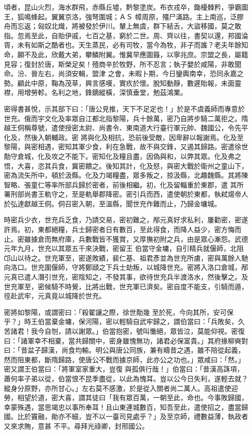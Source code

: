 \begin{pinyinscope}
 頃者，昆山火烈，海水群飛，赤縣丘墟，黔黎塗炭。布衣戎卒，鋤櫌棘矜，爭霸圖王，狐鳴蜂起。翼翼京洛，強弩圍城；ＡＳ
 幛周原，殭尸滿路。主上南巡，泛膠舟而忘返；匈奴北熾，將被發於伊川。輦上無虞，群下結舌，大盜移國，莫之敢指。忽焉至此，自貽伊戚，七百之基，窮於二世。周、齊以往，書契以還，邦國淪胥，未有如斯之酷者也。天生蒸民，必有司牧，當今為牧，非子而誰？老夫年餘知命，願不及此，欣戴大弟，攀鱗附翼。惟冀早應圖籙，以寧兆庶。宗盟之長，屬籍見容；復封於唐，斯榮足矣！殪商辛於牧野，所不忍言；執子嬰於咸陽，非敢聞命。汾、晉左右，尚須安輯，盟津
 之會，未暇卜期，今日鑾輿南幸，恐同永嘉之勢。顧此中原，鞠為茂草，興言感嘆，實疚於懷。脫知動靜，數遲貽報，未面靈襟，用增勞軫。名利之地，鋒鏑縱橫，深慎垂堂，勉茲鴻業。



 密得書甚悅，示其部下曰：「唐公見推，天下不足定也！」於是不虞義師而專意於世充。俄而宇文化及率眾自江都北指黎陽，兵十餘萬，密乃自將步騎二萬拒之。隋越王侗稱尊號，遣使授密太尉、尚書令、東南道大行臺行軍元帥、魏國公，令先平化及，然後入朝輔政。密
 將與化及相抗，恐前後受敵，因卑辭以報謝焉。化及至黎陽，與密相遇，密知其軍少食，利在急戰，故不與交鋒，又遏其歸路。密遣徐世勣守倉城，化及攻之不能下。密知化及糧且盡，因偽與和，以弊其眾。化及弗之悟，大喜，恣其兵食，冀密饋之。後知其計，化及怒，與密大戰於衛州之童山下，密為流矢所中，頓於汲縣。化及力竭糧盡，眾多叛之，掠汲縣，北趣魏縣。其將陳智略、張童仁等率所部兵歸於密者，前後相繼。初，化及留輜重於東郡，遣
 其所署刑部尚書王軌守之，至是軌舉郡降密。密引兵而西，遣使朝於東都，執弒煬帝人於弘達獻越王侗。侗召密入朝，至溫縣，聞世充作難而止，乃歸金墉城。



 時密兵少衣，世充兵乏食，乃請交易，密初難之，邴元真好求私利，屢勸密，密遂許焉。初，東都絕糧，兵士歸密者日有數百，至此得食，而降人益少，密方悔而止。密雖據倉而無府庫，兵數戰皆不獲賞，又厚撫初附之兵，由是眾心漸怨。武德元年九月，世充以其眾五千來決戰，密留王
 伯當守金墉，自引精兵就偃師，北阻邙山以待之。世充軍至，密遂敗績，裴仁基、祖君彥並為世充所虜，密與萬餘人馳向洛口。世充圍偃師，守將鄭頲之下兵士劫叛，以城降世充。密將入洛口倉城，邴元真已遣人潛引世充，密陰知之，不發其事，欲待世充兵半渡洛水，然後擊之。及世充軍至，密候騎不時覺，比將出戰，世充軍已濟矣。密自度不能支，引騎而遁，徑赴武牢，元真竟以城降於世充。



 密將如黎陽，或謂密曰：「殺翟讓之際，徐世勣幾
 至於死，今向其所，安可保乎？」時王伯當棄金墉，保河陽，密以輕騎自武牢歸之，謂伯當曰：「兵敗矣，久苦諸君！我今自刎，請以謝眾。」伯當抱密，號叫慟絕，眾皆泣，莫能仰視。密復曰：「諸軍幸不相棄，當共歸關中，密身雖愧無功，諸君必保富貴。」其府掾柳奭對曰：「昔盆子歸漢，尚食均輸。明公與唐公同族，兼有疇昔之遇，雖不陪從起義，然而阻東都，斷隋歸路，使唐公不戰而據京師，此亦公之功也。」眾咸曰：「然。」密又謂王伯當曰：「將軍室家重大，豈復
 與孤俱行哉！」伯當曰：「昔漢高誅項，蕭何率子弟以從，伯當恨不昆季盡從，以此為愧耳。豈以公今日失利，遂輕去就？縱身分原野，亦所甘心。」左右莫不感激，於是從入關者尚二萬人。高祖遣使迎勞，相望於道，密大喜，謂其徒曰「我有眾百萬，一朝至此，命也。今事敗歸國，幸蒙殊遇，當思竭忠以事所奉耳！且山東連城數百，知吾至此，遣使招之，盡當歸國。比於竇融，勛亦不細，豈不以一臺司見處乎？」及至京師，禮數益薄，執政者又來求賄，意甚
 不平。尋拜光祿卿，封邢國公。




\end{pinyinscope}
